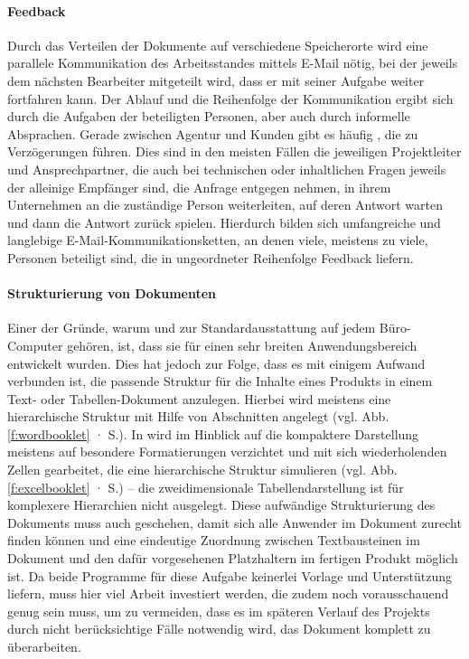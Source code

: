 \paragraph{Feedback} Durch das Verteilen der Dokumente auf verschiedene Speicherorte wird eine parallele Kommunikation des Arbeitsstandes mittels E-Mail nötig, bei der jeweils dem nächsten Bearbeiter mitgeteilt wird, dass er mit seiner Aufgabe weiter fortfahren kann. Der Ablauf und die Reihenfolge der Kommunikation ergibt sich durch die Aufgaben der beteiligten Personen, aber auch durch informelle Absprachen. Gerade zwischen Agentur und Kunden gibt es häufig , die zu Verzögerungen führen. Dies sind in den meisten Fällen die jeweiligen Projektleiter und Ansprechpartner, die auch bei technischen oder inhaltlichen Fragen jeweils der alleinige Empfänger sind, die Anfrage entgegen nehmen, in ihrem Unternehmen an die zuständige Person weiterleiten, auf deren Antwort warten und dann die Antwort zurück spielen. Hierdurch bilden sich umfangreiche und langlebige E-Mail-Kommunikationsketten, an denen viele, meistens zu viele, Personen beteiligt sind, die in ungeordneter Reihenfolge Feedback liefern.

\paragraph{Strukturierung von Dokumenten} Einer der Gründe, warum  und  zur Standardausstattung auf jedem Büro-Computer gehören, ist, dass sie für einen sehr breiten Anwendungsbereich entwickelt wurden. Dies hat jedoch zur Folge, dass es mit einigem Aufwand verbunden ist, die passende Struktur für die Inhalte eines Produkts in einem Text- oder Tabellen-Dokument anzulegen. Hierbei wird meistens eine hierarchische Struktur mit Hilfe von Abschnitten angelegt (vgl. Abb. \ref{f:wordbooklet} · S.\pageref{f:wordbooklet}). In  wird im Hinblick auf die kompaktere Darstellung meistens auf besondere Formatierungen verzichtet und mit sich wiederholenden Zellen gearbeitet, die eine hierarchische Struktur simulieren (vgl. Abb. \ref{f:excelbooklet} · S.\pageref{f:excelbooklet}) -- die zweidimensionale Tabellendarstellung ist für komplexere Hierarchien nicht ausgelegt. Diese aufwändige Strukturierung des Dokuments muss auch geschehen, damit sich alle Anwender im Dokument zurecht finden können und eine eindeutige Zuordnung zwischen Textbausteinen im Dokument und den dafür vorgesehenen Platzhaltern im fertigen Produkt möglich ist. Da beide Programme für diese Aufgabe keinerlei Vorlage und Unterstützung liefern, muss hier viel Arbeit investiert werden, die zudem noch vorausschauend genug sein muss, um zu vermeiden, dass es im späteren Verlauf des Projekts durch nicht berücksichtige Fälle notwendig wird, das Dokument komplett zu überarbeiten.

